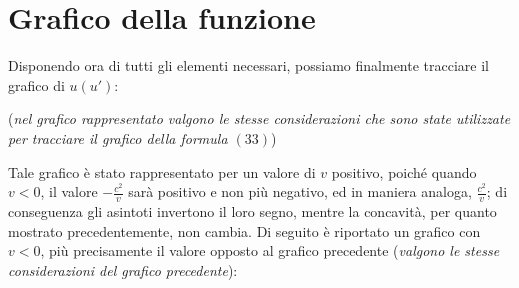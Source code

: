 \documentclass{article}
\begin{document}
\section{Grafico della funzione}
Disponendo ora di tutti gli elementi necessari,
possiamo finalmente tracciare il grafico di \(u(u')\):

\begin{center}
\end{center}

(\textit{nel grafico rappresentato valgono le stesse
considerazioni che sono state utilizzate per
tracciare il grafico della formula \((33)\)})\hfill\break

Tale grafico è stato rappresentato per un valore di
\(v\) positivo, poiché quando \(v < 0\), il valore
\(- \frac{c^2}{v}\) sarà positivo e non più negativo,
ed in maniera analoga, \(\frac{c^2}{v}\); di conseguenza
gli asintoti invertono il loro segno, mentre la concavità,
per quanto mostrato precedentemente, non cambia.
Di seguito è riportato un grafico con \(v < 0\), più
precisamente il valore opposto al grafico precedente
(\textit{valgono le stesse considerazioni del
grafico precedente}):
\end{document}
